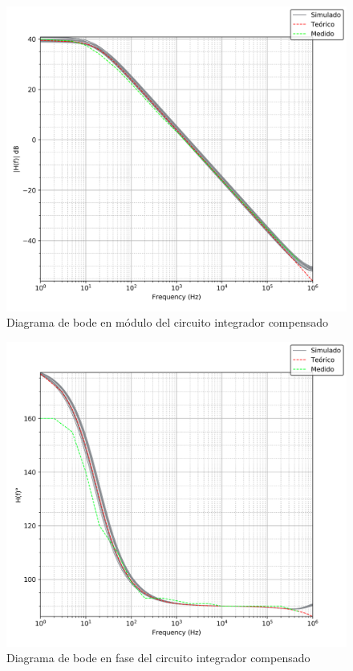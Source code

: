 \begin{figure}[H]
	\centering
	\includegraphics[scale=0.6]{Recursos/Integrador_compensado/bode_modulo.png}
	\caption{Diagrama de bode en m\'odulo del circuito integrador compensado}
	\label{fig:integrador_compensado_bode_modulo}
\end{figure}

\begin{figure}[H]
	\centering
	\includegraphics[scale=0.6]{Recursos/Integrador_compensado/bode_fase.png}
	\caption{Diagrama de bode en fase del circuito integrador compensado}
	\label{fig:integrador_compensado_bode_fase}
\end{figure}

